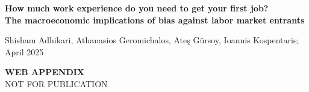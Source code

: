 \documentclass[12pt]{article} %
\theoremstyle{definition}
\begin{document}
\onehalfspacing

\noindent \large \textbf{How much work experience do you need to get your first job? \\ \normalsize The macroeconomic implications of bias against labor market entrants}

\vspace{0.6cm}

\noindent \normalsize Shisham Adhikari, Athanasios Geromichalos, Ate\c{s} G\"ursoy, Ioannis Kospentaris; \\
\medskip April 2025

\begin{center}
\Large \textbf{WEB APPENDIX} \\[2mm]

\normalsize NOT FOR PUBLICATION
\end{center}


\renewcommand{\theequation}{A.\arabic{equation}}

\end{document}
